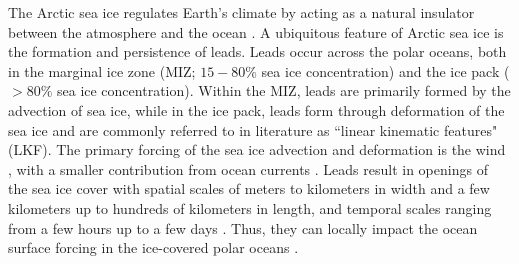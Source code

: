 \documentclass[lineno,sn-basic]{sn-jnl}%
\begin{document}


\maketitle


The Arctic sea ice regulates Earth's climate by acting as a natural insulator between the atmosphere and the ocean \citep{Wettlaufer_insulator_1997, Untersteiner_ice_insulator_1961}. A ubiquitous feature of Arctic sea ice is the formation and persistence of leads. Leads occur across the polar oceans, both in the marginal ice zone (MIZ; $15-80\%$ sea ice concentration) and the ice pack ($>80\%$ sea ice concentration). Within the MIZ, leads are primarily formed by the advection of sea ice, while in the ice pack, leads form through deformation of the sea ice and are commonly referred to in literature as ``linear kinematic features" (LKF). 
The primary forcing of the sea ice advection and deformation is the wind \citep{Linow_lkf_2017, Hutter_scaling_lkf_2018}, with a smaller contribution from ocean currents \citep{Willmes_leads_currents_2023}.
Leads result in openings of the sea ice cover \citep{Rampal_nextsim_2016, Hutchings_model_lkf_2005, Richter_pack_stress_2002} with spatial scales of meters to kilometers in width and a few kilometers up to hundreds of kilometers in length, and temporal scales ranging from a few hours up to a few days \citep{Linow_lkf_2017, Wernecke_Lead_2015, Tschudi_obs_leads_1998}. Thus, they can locally impact the ocean surface forcing in the ice-covered polar oceans \citep{Lupkes_leads_2008}.
\end{document}
